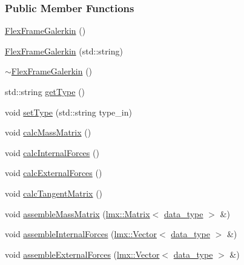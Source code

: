 \subsubsection*{Public Member Functions}
\begin{DoxyCompactItemize}
\item 
\hyperlink{classmknix_1_1_flex_frame_galerkin_a75d7ddbbdfa42764f60fee7bfb3655c8}{Flex\+Frame\+Galerkin} ()
\item 
\hyperlink{classmknix_1_1_flex_frame_galerkin_a47958fe6cb4b7be3f0dc9695a0127b68}{Flex\+Frame\+Galerkin} (std\+::string)
\item 
\hyperlink{classmknix_1_1_flex_frame_galerkin_a947c7fddeddbd9fa4669240e6fd04cc3}{$\sim$\+Flex\+Frame\+Galerkin} ()
\item 
std\+::string \hyperlink{classmknix_1_1_flex_frame_galerkin_ad383da86bfdaa68f2178fc87eb664c87}{get\+Type} ()
\item 
void \hyperlink{classmknix_1_1_flex_frame_galerkin_ad25d41d748f90be0eaea956a0141895c}{set\+Type} (std\+::string type\+\_\+in)
\item 
void \hyperlink{classmknix_1_1_flex_frame_galerkin_ad11cf5adf433ec3ed3b0bf205fd0adda}{calc\+Mass\+Matrix} ()
\item 
void \hyperlink{classmknix_1_1_flex_frame_galerkin_ae58a90cc7c8bb1f00012f6aa49c3271d}{calc\+Internal\+Forces} ()
\item 
void \hyperlink{classmknix_1_1_flex_frame_galerkin_a01c9230736b636729edf5b8c6a206d82}{calc\+External\+Forces} ()
\item 
void \hyperlink{classmknix_1_1_flex_frame_galerkin_a87a87843237896446126a3bbbde63ae3}{calc\+Tangent\+Matrix} ()
\item 
void \hyperlink{classmknix_1_1_flex_frame_galerkin_a0552eca6a0212ebf7248e1d40c9b4304}{assemble\+Mass\+Matrix} (\hyperlink{classlmx_1_1_matrix}{lmx\+::\+Matrix}$<$ \hyperlink{namespacemknix_a16be4b246fbf2cceb141e3a179111020}{data\+\_\+type} $>$ \&)
\item 
void \hyperlink{classmknix_1_1_flex_frame_galerkin_a62abb2ce6259737327fba83c725e9eaf}{assemble\+Internal\+Forces} (\hyperlink{classlmx_1_1_vector}{lmx\+::\+Vector}$<$ \hyperlink{namespacemknix_a16be4b246fbf2cceb141e3a179111020}{data\+\_\+type} $>$ \&)
\item 
void \hyperlink{classmknix_1_1_flex_frame_galerkin_a1a3ebbc84b363ce243bbb7a5ed5d9ae9}{assemble\+External\+Forces} (\hyperlink{classlmx_1_1_vector}{lmx\+::\+Vector}$<$ \hyperlink{namespacemknix_a16be4b246fbf2cceb141e3a179111020}{data\+\_\+type} $>$ \&)

\end{DoxyCompactItemize}
